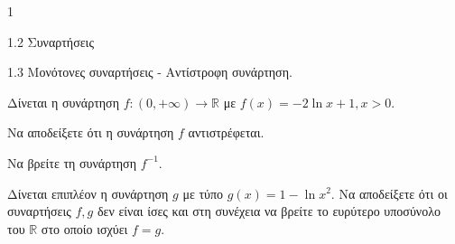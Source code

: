 \begin{ylh}{1}
    \item 1.2 Συναρτήσεις
    \item 1.3 Μονότονες συναρτήσεις - Αντίστροφη συνάρτηση.
\end{ylh}
Δίνεται η συνάρτηση $f : (0, +\infty) \to \mathbb{R}$ με $f(x) = -2\ln x+1, x > 0$.
\begin{alist}
\item Να αποδείξετε ότι η συνάρτηση $f$ αντιστρέφεται. 
\item Να βρείτε τη συνάρτηση $f^{-1}$. 
\item Δίνεται επιπλέον η συνάρτηση $g$ με τύπο $g(x)=1-\ln x^2$. Να αποδείξετε ότι οι συναρτήσεις $f, g$ δεν είναι ίσες και στη συνέχεια να βρείτε το ευρύτερο υποσύνολο του $\mathbb{R}$ στο οποίο ισχύει $f = g$. 
\end{alist}